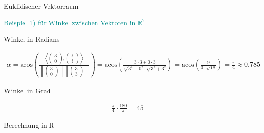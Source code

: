 \documentclass[
  8pt,
  ignorenonframetext,
]{beamer}
\begin{document}
\begin{frame}[fragile]{Euklidischer Vektorraum}
\protect\hypertarget{euklidischer-vektorraum-10}{}
\vspace{3mm}

\textcolor{darkcyan}{Beispiel 1) für Winkel zwischen Vektoren in $\mathbb{R}^2$}

\vspace{6pt}
\small

Winkel in Radians

\footnotesize

\begin{align*}
\alpha = \mbox{acos} \left ( \frac{\left \langle \begin{pmatrix} 3\\0 \end{pmatrix}, \begin{pmatrix} 3\\3 \end{pmatrix} \right \rangle}{\left \lVert \begin{pmatrix}3\\0\end{pmatrix}\right \rVert\left \lVert \begin{pmatrix}3\\3\end{pmatrix}\right \rVert}\right)
= \mbox{acos}\left(\frac{3 \cdot 3 + 0 \cdot 3}{\sqrt{3^2 + 0^2} \cdot \sqrt{3^2 + 3^2}}\right)
= \mbox{acos}\left(\frac{9}{3 \cdot \sqrt{18}}\right)
= \frac{\pi}{4} \approx 0.785
\end{align*}

\vspace{6pt}
\small

Winkel in Grad

\footnotesize

\begin{align*}
\frac{\pi}{4} \cdot \frac{180}{\pi} = 45
\end{align*}

\small

Berechnung in R \footnotesize


\end{frame}
\end{document}
